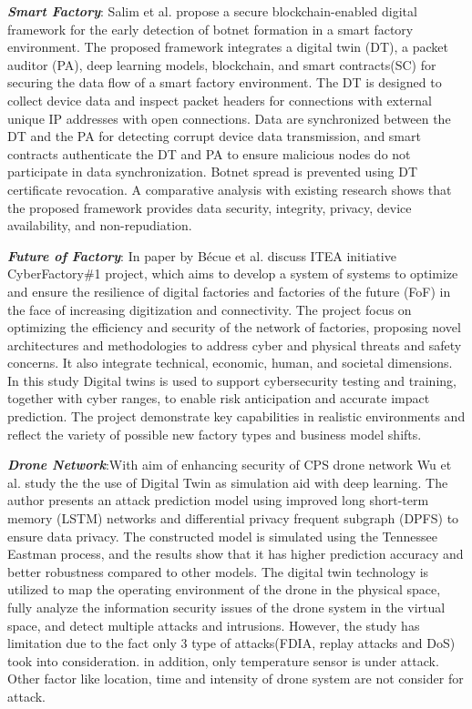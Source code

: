 \textbf{\textit{Smart Factory}}: Salim et al.\cite{salimBlockchainEnabledSecureDigital2022} propose a secure blockchain-enabled digital framework for the early detection of botnet formation in a smart factory environment. The proposed framework integrates a digital twin (DT), a packet auditor (PA), deep learning models, blockchain, and smart contracts(SC) for securing the data flow of a smart factory environment. The DT is designed to collect device data and inspect packet headers for connections with external unique IP addresses with open connections. Data are synchronized between the DT and the PA for detecting corrupt device data transmission, and smart contracts authenticate the DT and PA to ensure malicious nodes do not participate in data synchronization. Botnet spread is prevented using DT certificate revocation. A comparative analysis with existing research shows that the proposed framework provides data security, integrity, privacy, device availability, and non-repudiation.


\textbf{\textit{Future of Factory}}: In\cite{becueCyberFactorySecuringIndustry40with2018} paper by Bécue et al. discuss ITEA initiative CyberFactory\#1 project, which aims to develop a system of systems to optimize and ensure the resilience of digital factories and factories of the future (FoF) in the face of increasing digitization and connectivity. The project focus on optimizing the efficiency and security of the network of factories, proposing novel architectures and methodologies to address cyber and physical threats and safety concerns. It also integrate technical, economic, human, and societal dimensions. In this study Digital twins is used to support cybersecurity testing and training, together with cyber ranges, to enable risk anticipation and accurate impact prediction. The project demonstrate key capabilities in realistic environments and reflect the variety of possible new factory types and business model shifts.

\textbf{\textit{Drone Network}}:With aim of enhancing security of CPS drone network Wu et al.\cite{wuDeepLearningDriven2022} study the the use of Digital Twin as simulation aid with deep learning.  
The author presents an attack prediction model  using improved long short-term memory (LSTM) networks and differential privacy frequent subgraph (DPFS) to ensure data privacy. The constructed model is simulated using the Tennessee Eastman process, and the results show that it has higher prediction accuracy and better robustness compared to other models. The digital twin technology is utilized to map the operating environment of the drone in the physical space, fully analyze the information security issues of the drone system in the virtual space, and detect multiple attacks and intrusions. However, the study has limitation due to the fact only 3 type of attacks(FDIA, replay attacks and DoS) took into consideration. in addition, only temperature sensor is under attack. Other factor like location, time and intensity of drone system are not consider for attack.  

